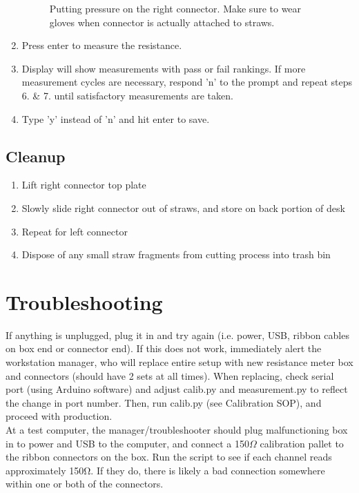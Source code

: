 \documentclass[letterpaper,12pt]{article}
\begin{document}
\begin{enumerate}
\begin{figure}[h]
		\caption{Putting pressure on the right connector. Make sure to wear gloves when connector is actually attached to straws.}
	\end{figure}
	\item Press enter to measure the resistance.
	\item Display will show measurements with pass or fail rankings. If more measurement cycles are necessary, respond 'n' to the prompt and repeat steps 6. \& 7. until satisfactory measurements are taken.
	\item Type 'y' instead of 'n' and hit enter to save.
\end{enumerate}

\subsection{Cleanup}
\begin{enumerate}
	\item Lift right connector top plate
	\item Slowly slide right connector out of straws, and store on back portion of desk
	\item Repeat for left connector
	\item Dispose of any small straw fragments from cutting process into trash bin
\end{enumerate}

\section{Troubleshooting}

If anything is unplugged, plug it in and try again (i.e. power, USB, ribbon cables on box end or connector end). If this does not work, immediately alert the workstation manager, who will replace entire setup with new resistance meter box and connectors (should have 2 sets at all times). When replacing, check serial port (using Arduino software) and adjust calib.py and measurement.py to reflect the change in port number. Then, run calib.py (see Calibration SOP), and proceed with production. \\

At a test computer, the manager/troubleshooter should plug malfunctioning box in to power and USB to the computer, and connect a 150$\Omega$ calibration pallet to the ribbon connectors on the box. Run the script to see if each channel reads approximately 150Ω. If they do, there is likely a bad connection somewhere within one or both of the connectors. 
\end{document}
